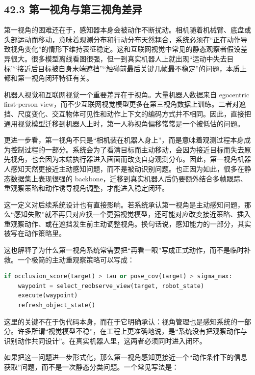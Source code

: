 \subsection*{42.3 第一视角与第三视角差异}


第一视角的困难还在于，感知器本身会被动作不断扰动。相机随着机械臂、底盘或头部运动而移动，意味着观测分布和行动分布天然耦合，系统必须在“正在动作导致视角变化”的情形下维持表征稳定。这和互联网视觉中常见的静态观察者假设差异很大。很多模型离线看图很强，但一到真实机器人上就出现“运动中失去目标”“接近后目标被自身末端遮挡”“触碰前最后关键几帧最不稳定”的问题，本质上都和第一视角闭环特征有关。

机器人视觉和互联网视觉一个重要差异在于视角。大量机器人数据来自 egocentric first-person view，而不少互联网视觉模型更多在第三视角数据上训练。二者对遮挡、尺度变化、交互物体可见性和动作上下文的编码方式并不相同。因此，直接把通用视觉模型迁移到机器人上时，第一人称视角偏移常常是一个被低估的问题。

更进一步看，第一视角不只是“相机装在机器人身上”，而是意味着观测过程本身成为控制过程的一部分。系统会为了看清目标而主动移动，会因为接近目标而失去原先视角，也会因为末端执行器进入画面而改变自身观测分布。因此，第一视角机器人感知天然更接近主动感知问题，而不是被动识别问题。也正因为如此，很多在静态数据集上表现很强的 backbone，迁移到真实机器人后仍要额外结合多帧跟踪、重观察策略和动作诱导视角调整，才能进入稳定闭环。

这一定义对后续系统设计也有直接影响。若系统承认第一视角是主动感知问题，那么“感知失败”就不再只对应换一个更强视觉模型，还可能对应改变接近策略、插入重观察动作、或在遮挡发生前主动调整视角。换句话说，感知能力的一部分，其实被写在动作策略里。

这也解释了为什么第一视角系统常需要把“再看一眼”写成正式动作，而不是临时补救。一个极简的主动重观察策略可以写成：

\begin{lstlisting}[language=python]
if occlusion_score(target) > tau or pose_cov(target) > sigma_max:
    waypoint = select_reobserve_view(target, robot_state)
    execute(waypoint)
    refresh_object_state()
\end{lstlisting}

这里的关键不在于伪代码本身，而在于它明确承认：视角管理也是感知系统的一部分。许多所谓“视觉模型不稳”，在工程上更准确地说，是“系统没有把观察动作与识别动作共同设计”。在真实机器人里，这两者必须同时进入闭环。

如果把这一问题进一步形式化，那么第一视角感知更接近一个“动作条件下的信息获取”问题，而不是一次静态分类问题。一个常见写法是：

